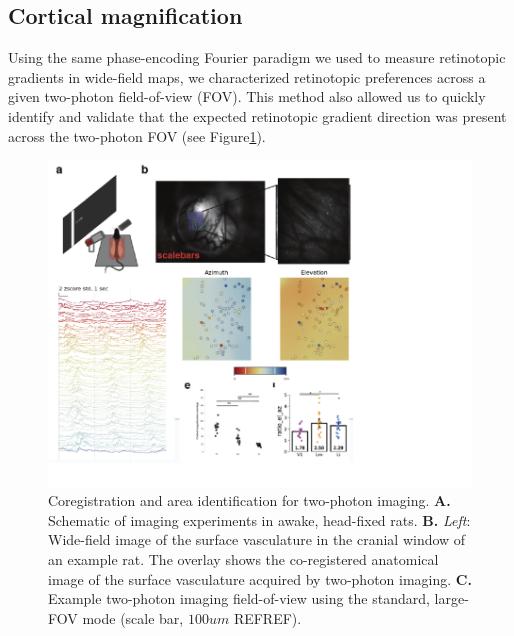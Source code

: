 \subsection{Cortical magnification}

Using the same phase-encoding Fourier paradigm we used to measure retinotopic gradients in wide-field maps, we characterized retinotopic preferences across a given two-photon field-of-view (FOV). This method also allowed us to quickly identify and validate that the expected retinotopic gradient direction was present across the two-photon FOV (see Figure\ref{fig:2p_retino}).

\begin{figure}
    \includegraphics[width=\textwidth]{figures/chapter_3/2p_retino/2p_retino.pdf}
    \vspace{.1in}
    \caption[Identification of areas with two-photon imaging]{Coregistration and area identification for two-photon imaging. \textbf{A.} Schematic of imaging experiments in awake, head-fixed rats. \textbf{B.} \textit{Left}: Wide-field image of the surface vasculature in the cranial window of an example rat. The overlay shows the co-registered anatomical image of the surface vasculature acquired by two-photon imaging. \textbf{C.} Example two-photon imaging field-of-view using the standard, large-FOV mode (scale bar, $100um$ REFREF). 
    \label{fig:2p_retino}}
\end{figure}

